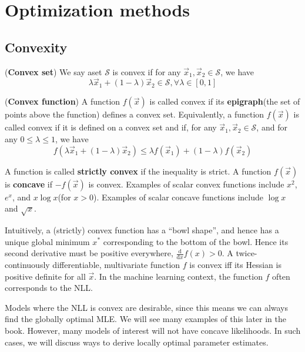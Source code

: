 \chapter{Optimization methods}
\label{chap:Optimization-methods}


\section{Convexity}
\label{sec:Convexity}

\begin{definition}
(\textbf{Convex set}) We say aset $\mathcal{S}$ is convex if for any $\vec{x}_1, \vec{x}_2 \in \mathcal{S}$, we have
\begin{equation}
\lambda\vec{x}_1+(1-\lambda)\vec{x}_2 \in \mathcal{S}, \forall \lambda \in [0,1]
\end{equation}
\end{definition}

\begin{definition}
(\textbf{Convex function}) A function $f(\vec{x})$ is called convex if its \textbf{epigraph}(the set of points above the function) defines a convex set. Equivalently, a function $f(\vec{x})$ is called convex if it is defined on a convex set and if, for any $\vec{x}_1, \vec{x}_2 \in \mathcal{S}$, and for any $0 \leq \lambda \leq 1$, we have
\begin{equation}
f(\lambda\vec{x}_1+(1-\lambda)\vec{x}_2) \leq \lambda f(\vec{x}_1)+(1-\lambda)f(\vec{x}_2)
\end{equation}
\end{definition}

A function is called \textbf{strictly convex} if the inequality is strict. A
function $f(\vec{x})$ is \textbf{concave} if $-f(\vec{x})$ is convex. Examples of scalar convex functions include $x^2$, $e^x$, and $x\log x$(for $x>0$). Examples of scalar concave functions include $\log x$ and $\sqrt x$.

Intuitively, a (strictly) convex function has a “bowl shape”, and hence has a unique global minimum $x^*$ corresponding to the bottom of the bowl. Hence its second derivative must be positive everywhere, $\frac{\mathrm{d}}{\mathrm{d}x}f(x)>0$. A twice-continuously differentiable, multivariate function $f$ is convex iff its Hessian is positive definite for all $\vec{x}$. In the machine learning context, the function $f$ often corresponds to the NLL.

Models where the NLL is convex are desirable, since this means we can always find the globally optimal MLE. We will see many examples of this later in the book. However, many models of interest will not have concave likelihoods. In such cases, we will discuss ways to derive locally optimal parameter estimates.


